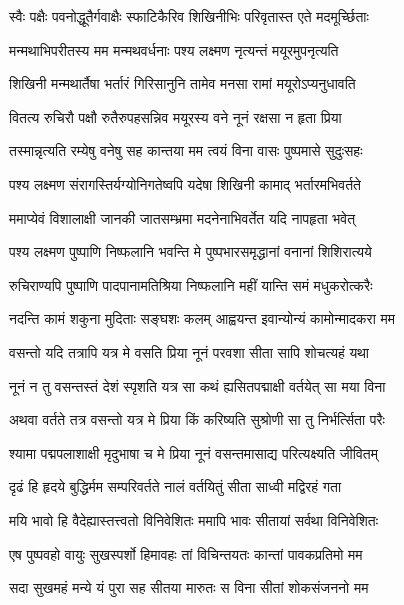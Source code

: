 \twolineshloka
{स्वैः पक्षैः पवनोद्धूतैर्गवाक्षैः स्फाटिकैरिव}
{शिखिनीभिः परिवृतास्त एते मदमूर्च्छिताः} %

\twolineshloka
{मन्मथाभिपरीतस्य मम मन्मथवर्धनाः}
{पश्य लक्ष्मण नृत्यन्तं मयूरमुपनृत्यति} %

\twolineshloka
{शिखिनी मन्मथार्तैषा भर्तारं गिरिसानुनि}
{तामेव मनसा रामां मयूरोऽप्यनुधावति} %

\twolineshloka
{वितत्य रुचिरौ पक्षौ रुतैरुपहसन्निव}
{मयूरस्य वने नूनं रक्षसा न हृता प्रिया} %

\twolineshloka
{तस्मान्नृत्यति रम्येषु वनेषु सह कान्तया}
{मम त्वयं विना वासः पुष्पमासे सुदुःसहः} %

\twolineshloka
{पश्य लक्ष्मण संरागस्तिर्यग्योनिगतेष्वपि}
{यदेषा शिखिनी कामाद् भर्तारमभिवर्तते} %

\twolineshloka
{ममाप्येवं विशालाक्षी जानकी जातसम्भ्रमा}
{मदनेनाभिवर्तेत यदि नापहृता भवेत्} %

\twolineshloka
{पश्य लक्ष्मण पुष्पाणि निष्फलानि भवन्ति मे}
{पुष्पभारसमृद्धानां वनानां शिशिरात्यये} %

\twolineshloka
{रुचिराण्यपि पुष्पाणि पादपानामतिश्रिया}
{निष्फलानि महीं यान्ति समं मधुकरोत्करैः} %

\twolineshloka
{नदन्ति कामं शकुना मुदिताः सङ्घशः कलम्}
{आह्वयन्त इवान्योन्यं कामोन्मादकरा मम} %

\twolineshloka
{वसन्तो यदि तत्रापि यत्र मे वसति प्रिया}
{नूनं परवशा सीता सापि शोचत्यहं यथा} %

\twolineshloka
{नूनं न तु वसन्तस्तं देशं स्पृशति यत्र सा}
{कथं ह्यसितपद्माक्षी वर्तयेत् सा मया विना} %

\twolineshloka
{अथवा वर्तते तत्र वसन्तो यत्र मे प्रिया}
{किं करिष्यति सुश्रोणी सा तु निर्भर्त्सिता परैः} %

\twolineshloka
{श्यामा पद्मपलाशाक्षी मृदुभाषा च मे प्रिया}
{नूनं वसन्तमासाद्य परित्यक्ष्यति जीवितम्} %

\twolineshloka
{दृढं हि हृदये बुद्धिर्मम सम्परिवर्तते}
{नालं वर्तयितुं सीता साध्वी मद्विरहं गता} %

\twolineshloka
{मयि भावो हि वैदेह्यास्तत्त्वतो विनिवेशितः}
{ममापि भावः सीतायां सर्वथा विनिवेशितः} %

\twolineshloka
{एष पुष्पवहो वायुः सुखस्पर्शो हिमावहः}
{तां विचिन्तयतः कान्तां पावकप्रतिमो मम} %

\twolineshloka
{सदा सुखमहं मन्ये यं पुरा सह सीतया}
{मारुतः स विना सीतां शोकसंजननो मम} %

